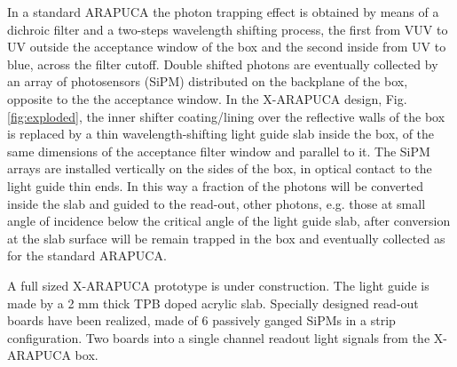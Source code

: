  In a standard ARAPUCA the photon trapping effect is obtained by means of a dichroic filter and a two-steps wavelength shifting process, the first from VUV to UV outside the acceptance window of the box and the second inside from UV to blue, across the filter cutoff. Double shifted photons are eventually collected by an array of photosensors (SiPM) distributed on the backplane of the box, opposite to the the acceptance window. In the X-ARAPUCA design, Fig.\ref{fig:exploded}, the inner shifter coating/lining over the reflective walls of the box is replaced by a thin wavelength-shifting light guide slab inside the box, of the same dimensions of the acceptance filter window and parallel to it. The SiPM arrays are installed vertically on the sides of the box, in optical contact to the light guide thin ends. 
 In this way a fraction of the photons will be converted inside the slab and guided to the read-out, other photons,  e.g. those at small angle of incidence below the critical angle of the light guide slab, after conversion at the slab surface will be remain trapped in the box and eventually collected as for the standard ARAPUCA.
 
 A full sized X-ARAPUCA prototype is under construction. The light guide is made by a 2 mm thick TPB doped acrylic slab. Specially designed read-out boards have been realized, made of 6 passively ganged SiPMs in a strip configuration.  Two boards into a single channel readout light signals from the X-ARAPUCA box.  \\
 
